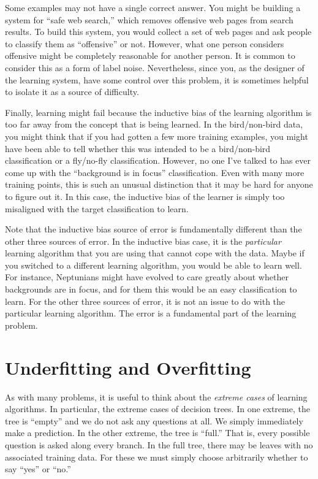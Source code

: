Some examples may not have a single correct answer.  You might be
building a system for ``safe web search,'' which removes offensive web
pages from search results.  To build this system, you would collect a
set of web pages and ask people to classify them as ``offensive'' or
not.  However, what one person considers offensive might be completely
reasonable for another person.  It is common to consider this as a
form of label noise.  Nevertheless, since you, as the designer of the
learning system, have some control over this problem, it is sometimes
helpful to isolate it as a source of difficulty.

Finally, learning might fail because the inductive bias of the
learning algorithm is too far away from the concept that is being
learned.  In the bird/non-bird data, you might think that if you had
gotten a few more training examples, you might have been able to tell
whether this was intended to be a bird/non-bird classification or a
fly/no-fly classification.  However, no one I've talked to has ever
come up with the ``background is in focus'' classification.  Even with
many more training points, this is such an unusual distinction that it
may be hard for anyone to figure out it.  In this case, the inductive
bias of the learner is simply too misaligned with the target
classification to learn.

Note that the inductive bias source of error is fundamentally
different than the other three sources of error.  In the inductive
bias case, it is the \emph{particular} learning algorithm that you are
using that cannot cope with the data.  Maybe if you switched to a
different learning algorithm, you would be able to learn well.  For
instance, Neptunians might have evolved to care greatly about whether
backgrounds are in focus, and for them this would be an easy
classification to learn.  For the other three sources of error, it is
not an issue to do with the particular learning algorithm.  The error
is a fundamental part of the learning problem.

\section{Underfitting and Overfitting}

As with many problems, it is useful to think about the \emph{extreme
  cases} of learning algorithms.  In particular, the extreme cases of
decision trees.  In one extreme, the tree is ``empty'' and we do not
ask any questions at all.  We simply immediately make a prediction.  In
the other extreme, the tree is ``full.''  That is, every possible
question is asked along every branch.  In the full tree, there may be
leaves with no associated training data.  For these we must simply
choose arbitrarily whether to say ``yes'' or ``no.''

